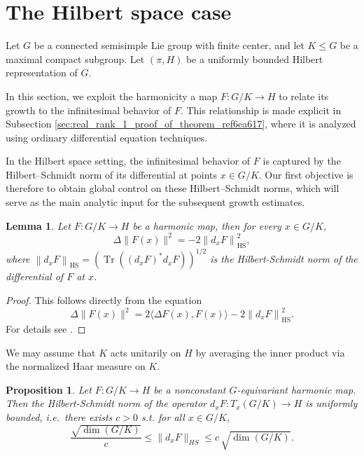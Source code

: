 \documentclass[12pt]{amsart}
\newtheorem{proposition}[theorem]{Proposition}
\newtheorem{lemma}[theorem]{Lemma}
\theoremstyle{definition}
\begin{document}
\section{The Hilbert space case}
\label{sec:the_hilbert_space_case}

Let \(G\) be a connected semisimple Lie group with finite center, and
let \(K \leq G\) be a maximal compact subgroup. Let \((\pi,H)\) be a
uniformly bounded Hilbert representation of \(G\).

In this section, we exploit the harmonicity a map \(F: G/K \to H\) to
relate its growth to the infinitesimal behavior of \(F\). This
relationship is made explicit in Subsection
\ref{sec:real_rank_1_proof_of_theorem_ref6ea617}, where it is analyzed
using ordinary differential equation techniques.

In the Hilbert space setting, the infinitesimal behavior of \(F\) is
captured by the Hilbert--Schmidt norm of its differential at points
\(x \in G/K\). Our first objective is therefore to obtain global control
on these Hilbert--Schmidt norms, which will serve as the main analytic
input for the subsequent growth estimates.


\begin{lemma}
\label{428ac3}
Let \(F: G/K \to H\) be a harmonic map, then for every \(x \in G/K\),
\[\Delta \|F(x)\|^2 = -2\left\|d_{x} F\right\|_{\mathrm{HS}}^2,\] where
\(\left\|d_{x} F\right\|_{\mathrm{HS}}=\left(\operatorname{Tr}\left(\left(d_{x} F\right)^* d_{x}F\right)\right)^{1 / 2}\)
is the Hilbert-Schmidt norm of the differential of \(F\) at \(x\).
\end{lemma}

\begin{proof}
This follows directly from the equation
\[\Delta \|F(x)\|^2 = 2 \langle\Delta F(x), F(x)\rangle -2\left\|d_{x} F\right\|_{\mathrm{HS}}^2.\]
For details see \cite[Proposition~3.3.14.]{Bekka2008}.

\end{proof}

We may assume that \(K\) acts unitarily on \(H\) by averaging the inner
product via the normalized Haar measure on \(K\).


\begin{proposition}
\label{2a47dc}
Let \(F: G/K \to H\) be a nonconstant \(G\)-equivariant harmonic map.
Then the Hilbert-Schmidt norm of the operator
\(d_{x}F: T_{x}(G/K) \to H\) is uniformly bounded, i.e.~there exists
\(c > 0\) s.t. for all \(x \in G/K\),
\[ \frac{\sqrt{ \operatorname{dim}(G/K) }}{c} \leq \|d_{x}F\|_{HS} \leq c \, \sqrt{ \operatorname{dim}(G/K) }.\]
\end{proposition}
\end{document}
